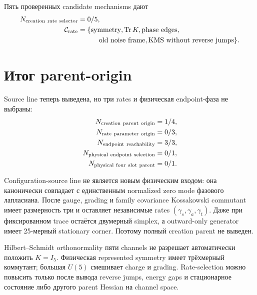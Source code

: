 Пять проверенных candidate mechanisms дают
\begin{equation}
 \begin{aligned}
 N_{\rm creation\ rate\ selector}&=0/5,\\
 \mathcal C_{\rm rate}&=\{\text{symmetry},\operatorname{Tr} K,\text{phase edges},\\
 &\hspace{3em}\text{old noise frame},
 \text{KMS without reverse jumps}\}.
 \end{aligned}
 \label{eq:v9-creation-origin-rate-candidate-ledger}
\end{equation}

\section{Итог parent-origin}

Source line теперь выведена, но три rates и физическая endpoint-фаза не
выбраны:
\begin{equation}
 \begin{aligned}
 N_{\rm creation\ parent\ origin}&=1/4,\\
 N_{\rm rate\ parameter\ origin}&=0/3,\\
 N_{\rm endpoint\ reachability}&=3/3,\\
 N_{\rm physical\ endpoint\ selection}&=0/1,\\
 N_{\rm physical\ four\ slot\ parent}&=0/1.
 \end{aligned}
 \label{eq:v9-creation-origin-final-ledgers}
\end{equation}

\begin{theorem}
Configuration-source line не является новым физическим входом: она
канонически совпадает с единственным normalized zero mode фазового
лапласиана. После gauge, grading и family covariance Kossakowski commutant
имеет размерность три и оставляет независимые rates
$(\gamma_s,\gamma_a,\gamma_t)$. Даже при фиксированном trace остаётся
двумерный simplex, а outward-only generator имеет 25-мерный stationary
corner. Поэтому полный creation parent не выведен.
\end{theorem}

\begin{nogocriterion}
Hilbert--Schmidt orthonormality пяти channels не разрешает автоматически
положить $K=I_5$. Физическая represented symmetry имеет трёхмерный
коммутант; большая $U(5)$ смешивает charge и grading. Rate-selection можно
повысить только после вывода reverse jumps, energy gaps и стационарное состояние
либо другого parent Hessian на channel space.
\end{nogocriterion}

